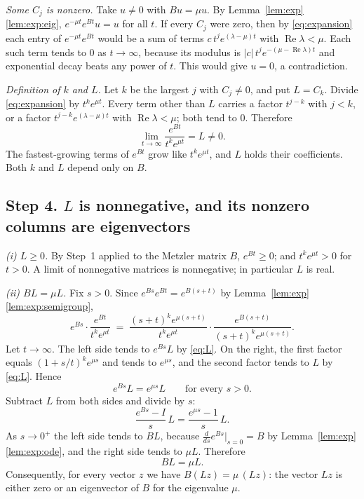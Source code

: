 \documentclass[11pt]{article}
\theoremstyle{definition}
\theoremstyle{remark}
\renewcommand{\Re}{\operatorname{Re}}
\begin{document}
\emph{Some $C_j$ is nonzero.} Take $u \ne 0$ with $Bu = \mu u$. By
Lemma~\ref{lem:exp}\ref{lem:exp:eig}, $e^{-\mu t} e^{Bt} u = u$ for all $t$. If every $C_j$ were
zero, then by \eqref{eq:expansion} each entry of $e^{-\mu t} e^{Bt}$ would be a sum of terms
$c\, t^{j} e^{(\lambda - \mu)t}$ with $\Re\lambda < \mu$. Each such term tends to $0$ as
$t \to \infty$, because its modulus is $|c|\, t^{j} e^{-(\mu - \Re\lambda)t}$ and exponential decay
beats any power of $t$. This would give $u = 0$, a contradiction.

\emph{Definition of $k$ and $L$.} Let $k$ be the largest $j$ with $C_j \ne 0$, and put $L = C_k$.
Divide \eqref{eq:expansion} by $t^{k} e^{\mu t}$. Every term other than $L$ carries a factor
$t^{j-k}$ with $j < k$, or a factor $t^{j-k} e^{(\lambda - \mu)t}$ with $\Re\lambda < \mu$; both
tend to $0$. Therefore
\begin{equation}\label{eq:L}
  \lim_{t \to \infty} \frac{e^{Bt}}{t^{k} e^{\mu t}} = L \ne 0 .
\end{equation}
The fastest-growing terms of $e^{Bt}$ grow like $t^{k} e^{\mu t}$, and $L$ holds their
coefficients. Both $k$ and $L$ depend only on $B$.

\subsection*{Step 4. $L$ is nonnegative, and its nonzero columns are eigenvectors}

\emph{\textup{(i)} $L \ge 0$.} By Step~1 applied to the Metzler matrix $B$, $e^{Bt} \ge 0$; and
$t^{k} e^{\mu t} > 0$ for $t > 0$. A limit of nonnegative matrices is nonnegative; in particular
$L$ is real.

\emph{\textup{(ii)} $BL = \mu L$.} Fix $s > 0$. Since $e^{Bs} e^{Bt} = e^{B(s+t)}$ by
Lemma~\ref{lem:exp}\ref{lem:exp:semigroup},
\[
  e^{Bs} \cdot \frac{e^{Bt}}{t^{k} e^{\mu t}}
  \;=\;
  \frac{(s+t)^{k} e^{\mu(s+t)}}{t^{k} e^{\mu t}}
  \cdot
  \frac{e^{B(s+t)}}{(s+t)^{k} e^{\mu(s+t)}} .
\]
Let $t \to \infty$. The left side tends to $e^{Bs} L$ by \eqref{eq:L}. On the right, the first
factor equals $(1 + s/t)^{k} e^{\mu s}$ and tends to $e^{\mu s}$, and the second factor tends to
$L$ by \eqref{eq:L}. Hence
\begin{equation}\label{eq:semigroup}
  e^{Bs} L = e^{\mu s} L \qquad \text{for every } s > 0 .
\end{equation}
Subtract $L$ from both sides and divide by $s$:
\[
  \frac{e^{Bs} - I}{s}\, L = \frac{e^{\mu s} - 1}{s}\, L .
\]
As $s \to 0^{+}$ the left side tends to $BL$, because
$\frac{d}{ds} e^{Bs} \big|_{s=0} = B$ by Lemma~\ref{lem:exp}\ref{lem:exp:ode}, and the right side
tends to $\mu L$. Therefore
\begin{equation}\label{eq:eig}
  BL = \mu L .
\end{equation}
Consequently, for every vector $z$ we have $B(Lz) = \mu\,(Lz)$: the vector $Lz$ is either zero or
an eigenvector of $B$ for the eigenvalue $\mu$.
\end{document}

